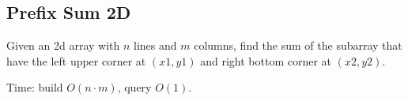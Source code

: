 \subsection{Prefix Sum 2D}

Given an 2d array with $n$ lines and $m$ columns, find the sum of the subarray that have the left upper corner at $(x1, y1)$ and right bottom corner at $(x2, y2)$.

Time: build $O(n \cdot m)$, query $O(1)$.
